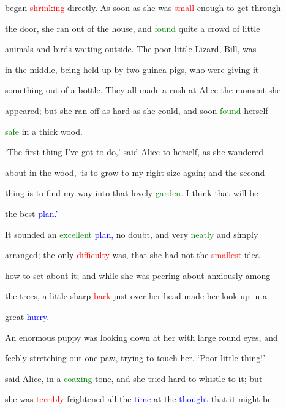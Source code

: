  began \textcolor{red}{shrinking} directly. As soon as she was \textcolor{red}{small} enough to get through

 the door, she ran out of the house, and \textcolor{green}{found} quite a crowd of little

 animals and birds \textcolor{BurntOrange}{waiting} outside. The poor little Lizard, Bill, was

 in the middle, being held up by two guinea-pigs, who were giving it

 something out of a bottle. They all made a rush at Alice the moment she

 appeared; but she ran off as hard as she could, and soon \textcolor{green}{found} herself

 \textcolor{green}{safe} in a thick wood.



 ‘The first thing I’ve got to do,’ said Alice to herself, as she wandered

 about in the wood, ‘is to \textcolor{BurntOrange}{grow} to my right size again; and the second

 thing is to find my way into that \textcolor{BurntOrange}{lovely} \textcolor{green}{garden.} I think that will be

 the best \textcolor{blue}{plan.’}



 It sounded an \textcolor{green}{excellent} \textcolor{blue}{plan,} no \textcolor{BurntOrange}{doubt,} and very \textcolor{green}{neatly} and simply

 arranged; the only \textcolor{red}{difficulty} was, that she had not the \textcolor{red}{smallest} idea

 how to set about it; and while she was peering about anxiously among

 the \textcolor{BurntOrange}{trees,} a little sharp \textcolor{red}{bark} just over her head made her look up in a

 great \textcolor{blue}{hurry.}



 An enormous \textcolor{BurntOrange}{puppy} was looking down at her with large round eyes, and

 feebly stretching out one paw, trying to touch her. ‘Poor little thing!’

 said Alice, in a \textcolor{green}{coaxing} tone, and she tried hard to whistle to it; but

 she was \textcolor{red}{terribly} \textcolor{BurntOrange}{frightened} all the \textcolor{blue}{time} at the \textcolor{blue}{thought} that it might be

